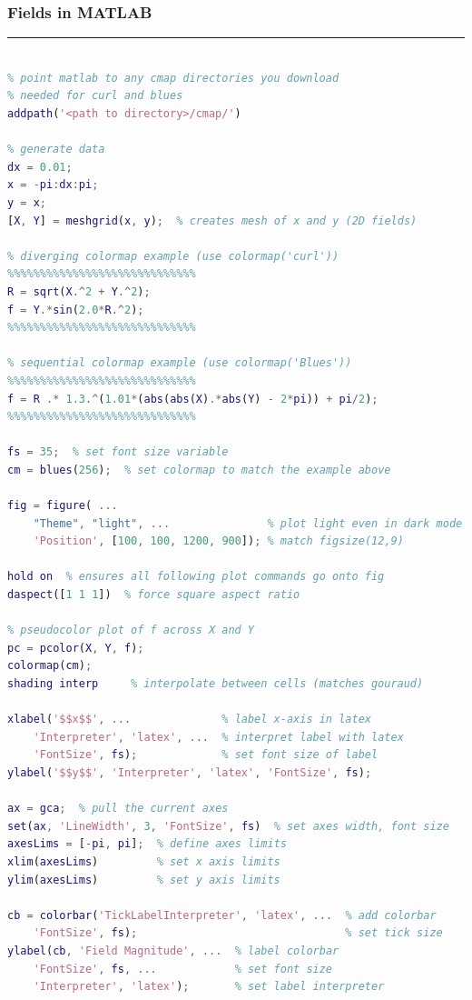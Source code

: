 \newpage 
{
\centering
\subsubsection{Fields in MATLAB}
\hrule
}
 \begin{lstlisting}[language=matlab]

% point matlab to any cmap directories you download
% needed for curl and blues
addpath('<path to directory>/cmap/')

% generate data
dx = 0.01;
x = -pi:dx:pi;
y = x;
[X, Y] = meshgrid(x, y);  % creates mesh of x and y (2D fields)

% diverging colormap example (use colormap('curl'))
%%%%%%%%%%%%%%%%%%%%%%%%%%%%%
R = sqrt(X.^2 + Y.^2);
f = Y.*sin(2.0*R.^2);
%%%%%%%%%%%%%%%%%%%%%%%%%%%%%

% sequential colormap example (use colormap('Blues'))
%%%%%%%%%%%%%%%%%%%%%%%%%%%%%
f = R .* 1.3.^(1.01*(abs(abs(X).*abs(Y) - 2*pi)) + pi/2);
%%%%%%%%%%%%%%%%%%%%%%%%%%%%%

fs = 35;  % set font size variable
cm = blues(256);  % set colormap to match the example above

fig = figure( ...
    "Theme", "light", ...               % plot light even in dark mode
    'Position', [100, 100, 1200, 900]); % match figsize(12,9)

hold on  % ensures all following plot commands go onto fig
daspect([1 1 1])  % force square aspect ratio

% pseudocolor plot of f across X and Y
pc = pcolor(X, Y, f);
colormap(cm);
shading interp     % interpolate between cells (matches gouraud)

xlabel('$$x$$', ...              % label x-axis in latex
    'Interpreter', 'latex', ...  % interpret label with latex
    'FontSize', fs);             % set font size of label
ylabel('$$y$$', 'Interpreter', 'latex', 'FontSize', fs);

ax = gca;  % pull the current axes
set(ax, 'LineWidth', 3, 'FontSize', fs)  % set axes width, font size
axesLims = [-pi, pi];  % define axes limits
xlim(axesLims)         % set x axis limits
ylim(axesLims)         % set y axis limits

cb = colorbar('TickLabelInterpreter', 'latex', ...  % add colorbar
    'FontSize', fs);                                % set tick size
ylabel(cb, 'Field Magnitude', ...  % label colorbar
    'FontSize', fs, ...            % set font size
    'Interpreter', 'latex');       % set label interpreter


\end{lstlisting}
